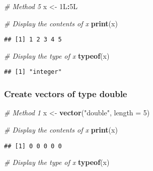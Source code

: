 \documentclass[
]{article}
\newenvironment{Shaded}{\begin{snugshade}}{\end{snugshade}}
\newcommand{\AttributeTok}[1]{\textcolor[rgb]{0.13,0.29,0.53}{#1}}
\newcommand{\CommentTok}[1]{\textcolor[rgb]{0.56,0.35,0.01}{\textit{#1}}}
\newcommand{\DecValTok}[1]{\textcolor[rgb]{0.00,0.00,0.81}{#1}}
\newcommand{\FunctionTok}[1]{\textcolor[rgb]{0.13,0.29,0.53}{\textbf{#1}}}
\newcommand{\NormalTok}[1]{#1}
\newcommand{\OtherTok}[1]{\textcolor[rgb]{0.56,0.35,0.01}{#1}}
\newcommand{\SpecialCharTok}[1]{\textcolor[rgb]{0.81,0.36,0.00}{\textbf{#1}}}
\newcommand{\StringTok}[1]{\textcolor[rgb]{0.31,0.60,0.02}{#1}}
\begin{document}
\begin{Shaded}
\begin{Highlighting}[]
\CommentTok{\# Method 5}
\NormalTok{x }\OtherTok{\textless{}{-}}\NormalTok{ 1L}\SpecialCharTok{:}\NormalTok{5L}

\CommentTok{\# Display the contents of x}
\FunctionTok{print}\NormalTok{(x)}
\end{Highlighting}
\end{Shaded}

\begin{verbatim}
## [1] 1 2 3 4 5
\end{verbatim}

\begin{Shaded}
\begin{Highlighting}[]
\CommentTok{\# Display the type of x}
\FunctionTok{typeof}\NormalTok{(x)}
\end{Highlighting}
\end{Shaded}

\begin{verbatim}
## [1] "integer"
\end{verbatim}

\hypertarget{create-vectors-of-type-double}{%
\subsubsection{Create vectors of type
double}\label{create-vectors-of-type-double}}

\begin{Shaded}
\begin{Highlighting}[]
\CommentTok{\# Method 1}
\NormalTok{x }\OtherTok{\textless{}{-}} \FunctionTok{vector}\NormalTok{(}\StringTok{"double"}\NormalTok{, }\AttributeTok{length =} \DecValTok{5}\NormalTok{)}

\CommentTok{\# Display the contents of x}
\FunctionTok{print}\NormalTok{(x)}
\end{Highlighting}
\end{Shaded}

\begin{verbatim}
## [1] 0 0 0 0 0
\end{verbatim}

\begin{Shaded}
\begin{Highlighting}[]
\CommentTok{\# Display the type of x}
\FunctionTok{typeof}\NormalTok{(x)}
\end{Highlighting}
\end{Shaded}
\end{document}

